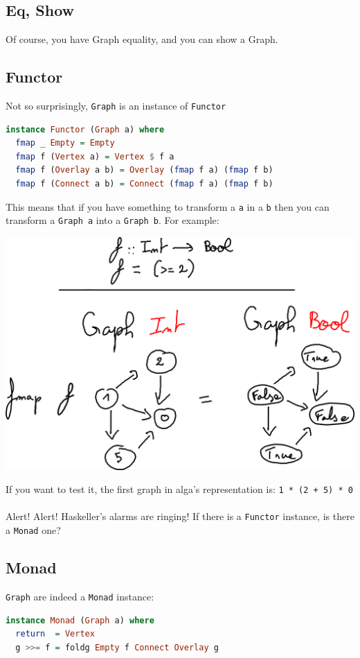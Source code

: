 \documentclass[10pt,a4paper]{article}
\begin{document}
\subsection{Eq, Show}
Of course, you have Graph equality, and you can show a Graph.

\subsection{Functor}
Not so surprisingly, \verb|Graph| is an instance of \verb|Functor|
\begin{lstlisting}[language=Haskell, frame=single]
instance Functor (Graph a) where
  fmap _ Empty = Empty
  fmap f (Vertex a) = Vertex $ f a
  fmap f (Overlay a b) = Overlay (fmap f a) (fmap f b)
  fmap f (Connect a b) = Connect (fmap f a) (fmap f b)
\end{lstlisting}
 
This means that if you have something to transform a \verb|a| in a \verb|b| then you can transform a \verb|Graph a| into a \verb|Graph b|. For example:

\begin{center}
	\includegraphics[scale=0.5]{figspng/fmap.png}
\end{center}

If you want to test it, the first graph in alga's representation is: \verb|1 * (2 + 5) * 0|
\\
\\
Alert! Alert! Haskeller's alarms are ringing! If there is a \verb|Functor| instance, is there a \verb|Monad| one?

\subsection{Monad}
\verb|Graph| are indeed a \verb|Monad| instance:
\begin{lstlisting}[language=Haskell, frame=single]
instance Monad (Graph a) where
  return  = Vertex
  g >>= f = foldg Empty f Connect Overlay g 
\end{lstlisting}
\end{document}

